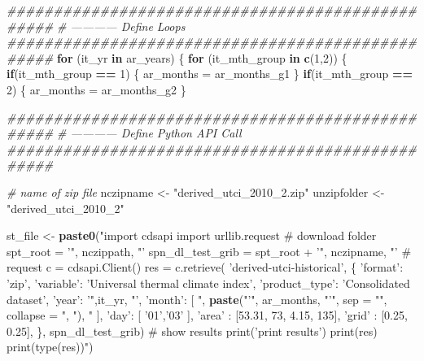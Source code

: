 \documentclass[
]{book}
\newenvironment{Shaded}{\begin{snugshade}}{\end{snugshade}}
\newcommand{\CommentTok}[1]{\textcolor[rgb]{0.56,0.35,0.01}{\textit{#1}}}
\newcommand{\ControlFlowTok}[1]{\textcolor[rgb]{0.13,0.29,0.53}{\textbf{#1}}}
\newcommand{\DataTypeTok}[1]{\textcolor[rgb]{0.13,0.29,0.53}{#1}}
\newcommand{\DecValTok}[1]{\textcolor[rgb]{0.00,0.00,0.81}{#1}}
\newcommand{\KeywordTok}[1]{\textcolor[rgb]{0.13,0.29,0.53}{\textbf{#1}}}
\newcommand{\NormalTok}[1]{#1}
\newcommand{\OperatorTok}[1]{\textcolor[rgb]{0.81,0.36,0.00}{\textbf{#1}}}
\newcommand{\StringTok}[1]{\textcolor[rgb]{0.31,0.60,0.02}{#1}}
\begin{document}
\begin{Shaded}
\begin{Highlighting}[]
\CommentTok{#################################################}
\CommentTok{# ------------ Define Loops}
\CommentTok{#################################################}
\ControlFlowTok{for}\NormalTok{ (it_yr }\ControlFlowTok{in}\NormalTok{ ar_years) \{}
  \ControlFlowTok{for}\NormalTok{ (it_mth_group }\ControlFlowTok{in} \KeywordTok{c}\NormalTok{(}\DecValTok{1}\NormalTok{,}\DecValTok{2}\NormalTok{)) \{}
    \ControlFlowTok{if}\NormalTok{(it_mth_group }\OperatorTok{==}\StringTok{ }\DecValTok{1}\NormalTok{) \{}
\NormalTok{      ar_months =}\StringTok{ }\NormalTok{ar_months_g1}
\NormalTok{    \}}
    \ControlFlowTok{if}\NormalTok{(it_mth_group }\OperatorTok{==}\StringTok{ }\DecValTok{2}\NormalTok{) \{}
\NormalTok{      ar_months =}\StringTok{ }\NormalTok{ar_months_g2}
\NormalTok{    \}}

    \CommentTok{#################################################}
    \CommentTok{# ------------ Define Python API Call}
    \CommentTok{#################################################}

    \CommentTok{# name of zip file}
\NormalTok{    nczipname <-}\StringTok{ "derived_utci_2010_2.zip"}
\NormalTok{    unzipfolder <-}\StringTok{ "derived_utci_2010_2"}

\NormalTok{    st_file <-}\StringTok{ }\KeywordTok{paste0}\NormalTok{(}\StringTok{"import cdsapi}
\StringTok{import urllib.request}
\StringTok{# download folder}
\StringTok{spt_root = '"}\NormalTok{, nczippath, }\StringTok{"'}
\StringTok{spn_dl_test_grib = spt_root + '"}\NormalTok{, nczipname, }\StringTok{"'}
\StringTok{# request}
\StringTok{c = cdsapi.Client()}
\StringTok{res = c.retrieve(}
\StringTok{    'derived-utci-historical',}
\StringTok{    \{}
\StringTok{        'format': 'zip',}
\StringTok{        'variable': 'Universal thermal climate index',}
\StringTok{        'product_type': 'Consolidated dataset',}
\StringTok{        'year': '"}\NormalTok{,it_yr, }\StringTok{"',}
\StringTok{        'month': [}
\StringTok{            "}\NormalTok{, }\KeywordTok{paste}\NormalTok{(}\StringTok{"'"}\NormalTok{, ar_months, }\StringTok{"'"}\NormalTok{, }\DataTypeTok{sep =} \StringTok{""}\NormalTok{, }\DataTypeTok{collapse =} \StringTok{", "}\NormalTok{), }\StringTok{"}
\StringTok{        ],}
\StringTok{        'day': [}
\StringTok{            '01','03'}
\StringTok{        ],}
\StringTok{        'area'  : [53.31, 73, 4.15, 135],}
\StringTok{        'grid'  : [0.25, 0.25],}
\StringTok{    \},}
\StringTok{    spn_dl_test_grib)}
\StringTok{# show results}
\StringTok{print('print results')}
\StringTok{print(res)}
\StringTok{print(type(res))"}\NormalTok{)}


\end{Highlighting}
\end{Shaded}
\end{document}
